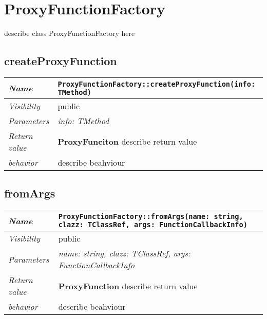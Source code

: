 \chapter{ProxyFunctionFactory}
describe class ProxyFunctionFactory here
\section{createProxyFunction}
\begin{longtable}{p{3cm} @{\hskip 1cm} p{12cm}}
 \hline
\textit{Name} & \texttt{ProxyFunctionFactory::createProxyFunction(info: TMethod)}\\
\hline
 \textit{Visibility} & public\\
\hline
\textit{Parameters} & \textit{info: TMethod}\\
\hline
\textit{Return value} & \textbf{ ProxyFunciton} describe return value\\
  \hline
 \textit{behavior} & describe beahviour \\
\hline
\end{longtable} \pagebreak
 \section{fromArgs}
\begin{longtable}{p{3cm} @{\hskip 1cm} p{12cm}}
 \hline
\textit{Name} & \texttt{ProxyFunctionFactory::fromArgs(name: string, clazz: TClassRef, args: FunctionCallbackInfo)}\\
\hline
 \textit{Visibility} & public\\
\hline
\textit{Parameters} & \textit{name: string, clazz: TClassRef, args: FunctionCallbackInfo}\\
\hline
\textit{Return value} & \textbf{ ProxyFunction} describe return value\\
  \hline
 \textit{behavior} & describe beahviour \\
\hline
\end{longtable} \pagebreak
 